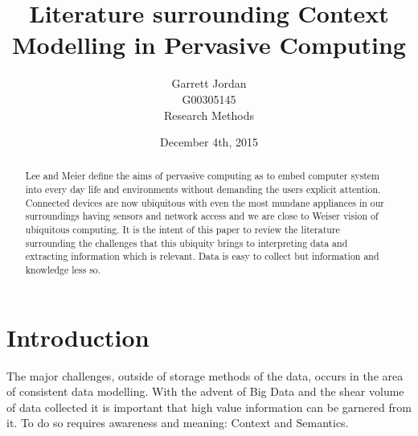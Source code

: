 \documentclass[]{report}
\title{Literature surrounding Context Modelling in Pervasive Computing}
\author{Garrett Jordan\\G00305145\\Research Methods}
\date{December 4th, 2015}
\begin{document}
\maketitle


% 
%

\begin{abstract}
Lee and Meier define the aims of pervasive computing as to embed computer system into every day life and environments without demanding the users explicit attention\cite{0}. Connected devices are now ubiquitous with even the most mundane appliances in our surroundings having sensors and network access and we are close to Weiser vision of ubiquitous computing\cite{1}. It is the intent of this paper to review the literature surrounding the challenges that this ubiquity brings to interpreting data and  extracting information which is relevant. Data is easy to collect but information and knowledge less so.
\end{abstract}

% 
%

\section*{Introduction}
The major challenges, outside of storage methods of the data, occurs in the area of consistent data modelling. With the advent of Big Data and the shear volume of data collected it is important that high value information can be garnered from it. To do so requires awareness and meaning: Context and Semantics.\\

% 
%
\end{document}
